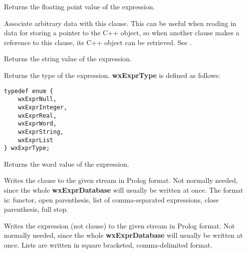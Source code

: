 \label{wxexprrealvalue}


Returns the floating point value of the expression.

\label{wxexprsetclientdata}


Associate arbitrary data with this clause. This can be useful when
reading in data for storing a pointer to the C++ object, so when another
clause makes a reference to this clause, its C++ object can be retrieved.
See .

\label{wxexprstringvalue}


Returns the string value of the expression.

\label{wxexprtype}


Returns the type of the expression. {\bf wxExprType} is defined as follows:

\begin{verbatim}
typedef enum {
    wxExprNull,
    wxExprInteger,
    wxExprReal,
    wxExprWord,
    wxExprString,
    wxExprList
} wxExprType;
\end{verbatim}

\label{wxexprwordvalue}


Returns the word value of the expression.

\label{wxexprwriteprologclause}


Writes the clause to the given stream in Prolog format. Not normally needed, since
the whole {\bf wxExprDatabase} will usually be written at once. The format is:
functor, open parenthesis, list of comma-separated expressions, close parenthesis,
full stop.

\label{wxexprwriteexpr}


Writes the expression (not clause) to the given stream in Prolog
format. Not normally needed, since the whole {\bf wxExprDatabase} will
usually be written at once. Lists are written in square bracketed,
comma-delimited format.

